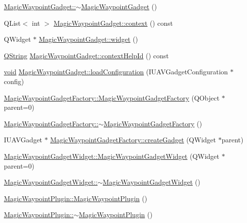 \begin{DoxyCompactItemize}
\item 
\hyperlink{group___g_c_s_control_gadget_plugin_ga7caf437fa3df4fc4c30bb259b16d5b89}{\-Magic\-Waypoint\-Gadget\-::$\sim$\-Magic\-Waypoint\-Gadget} ()
\item 
\-Q\-List$<$ int $>$ \hyperlink{group___g_c_s_control_gadget_plugin_ga7521519a1bb7dd420c9e4d2f1bf49a2f}{\-Magic\-Waypoint\-Gadget\-::context} () const 
\item 
\-Q\-Widget $\ast$ \hyperlink{group___g_c_s_control_gadget_plugin_ga361c7a72cf1a95a2cf36f858d5b9bee5}{\-Magic\-Waypoint\-Gadget\-::widget} ()
\item 
\hyperlink{group___u_a_v_objects_plugin_gab9d252f49c333c94a72f97ce3105a32d}{\-Q\-String} \hyperlink{group___g_c_s_control_gadget_plugin_gab2c239e4a2ee9921f9c9c0c79f769c3e}{\-Magic\-Waypoint\-Gadget\-::context\-Help\-Id} () const 
\item 
\hyperlink{group___u_a_v_objects_plugin_ga444cf2ff3f0ecbe028adce838d373f5c}{void} \hyperlink{group___g_c_s_control_gadget_plugin_ga163d222d9f3681fe93e07da2800e97ae}{\-Magic\-Waypoint\-Gadget\-::load\-Configuration} (\-I\-U\-A\-V\-Gadget\-Configuration $\ast$config)
\item 
\hyperlink{group___g_c_s_control_gadget_plugin_gae7ad3cb8d55b05f06354047f33941fc1}{\-Magic\-Waypoint\-Gadget\-Factory\-::\-Magic\-Waypoint\-Gadget\-Factory} (\-Q\-Object $\ast$parent=0)
\item 
\hyperlink{group___g_c_s_control_gadget_plugin_ga0b16d239f1aa3859ed11c4a572a9e5fd}{\-Magic\-Waypoint\-Gadget\-Factory\-::$\sim$\-Magic\-Waypoint\-Gadget\-Factory} ()
\item 
\-I\-U\-A\-V\-Gadget $\ast$ \hyperlink{group___g_c_s_control_gadget_plugin_gac8c3a2facf7fe1515b2d277b58ee9d0b}{\-Magic\-Waypoint\-Gadget\-Factory\-::create\-Gadget} (\-Q\-Widget $\ast$parent)
\item 
\hyperlink{group___g_c_s_control_gadget_plugin_ga6b1ff9f71795c087e84d4d30b1a60c6d}{\-Magic\-Waypoint\-Gadget\-Widget\-::\-Magic\-Waypoint\-Gadget\-Widget} (\-Q\-Widget $\ast$parent=0)
\item 
\hyperlink{group___g_c_s_control_gadget_plugin_ga2ffd0cf503fdefb31aa45a42b5cf63ba}{\-Magic\-Waypoint\-Gadget\-Widget\-::$\sim$\-Magic\-Waypoint\-Gadget\-Widget} ()
\item 
\hyperlink{group___g_c_s_control_gadget_plugin_ga89fc30c92d7ea9574134d87f7378a2b6}{\-Magic\-Waypoint\-Plugin\-::\-Magic\-Waypoint\-Plugin} ()
\item 
\hyperlink{group___g_c_s_control_gadget_plugin_ga4f66f5fe1f496bc719c7ca504b944579}{\-Magic\-Waypoint\-Plugin\-::$\sim$\-Magic\-Waypoint\-Plugin} ()

\end{DoxyCompactItemize}
